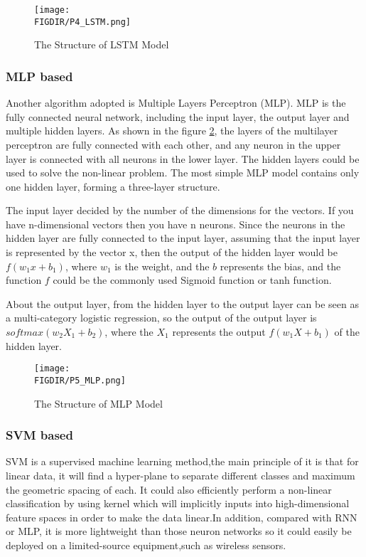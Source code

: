 \begin{figure}[ht]
\centering
\texttt{[image: \\FIGDIR/P4\_LSTM.png]}
\caption{The Structure of LSTM Model}
\label{LSTM}
\end{figure}
\subsubsection{MLP based}Another algorithm adopted is Multiple Layers Perceptron (MLP). MLP \cite{taud2018multilayer}  is the fully connected neural network, including the input layer, the output layer and multiple hidden layers. As shown in the figure \ref{MLP}, the layers of the multilayer perceptron are fully connected with each other, and any neuron in the upper layer is connected with all neurons in the lower layer. The hidden layers could be used to solve the non-linear problem. The most simple MLP model contains only one hidden layer, forming a three-layer structure. 

The input layer decided by the number of the dimensions for the vectors. If you have n-dimensional vectors then you have n neurons. Since the neurons in the hidden layer are fully connected to the input layer, assuming that the input layer is represented by the vector x, then the output of the hidden layer would be $f(w_1x+b_1)$, where $w_1$ is the weight, and the $b$ represents the bias, and the function $f$ could be the commonly used Sigmoid function or tanh function. 

About the output layer, from the hidden layer to the output layer can be seen as a multi-category logistic regression, so the output of the output layer is $softmax (w_2 X_1 +b_2)$, where the $X_1$ represents the output $f(w_1X + b_1)$ of the hidden layer. 

\begin{figure}[ht]
\centering
\texttt{[image: \\FIGDIR/P5\_MLP.png]}
\caption{The Structure of MLP Model}
\label{MLP}
\end{figure}

\subsubsection{SVM based}
SVM is a supervised machine learning method,the main principle of it is that for linear data, it will find a hyper-plane to separate different classes and maximum the geometric spacing of each. It could also efficiently perform a non-linear classification by using kernel which will implicitly inputs into high-dimensional feature spaces in order to make the data linear.In addition, compared with RNN or MLP, it is more lightweight than those neuron networks so it could easily be deployed on a limited-source equipment,such as wireless sensors.

